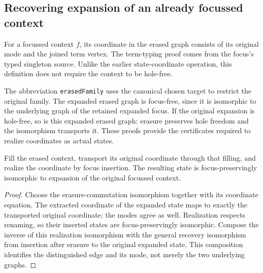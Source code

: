\subsection{Recovering expansion of an already focussed context}
\begin{definition}\label{term:context-coordinate}
For a focussed context $f$, its coordinate in the erased graph consists of its
original mode and the joined term vertex. The term-typing proof comes from the
focus's typed singleton source. Unlike the earlier state-coordinate operation,
this definition does not require the context to be hole-free.
\end{definition}
The abbreviation \texttt{erasedFamily} uses the canonical chosen target to
restrict the original family. The expanded erased graph is focus-free, since
it is isomorphic to the underlying graph of the retained expanded focus. If
the original expansion is hole-free, so is this expanded erased graph: erasure
preserves hole freedom and the isomorphism transports it. These proofs provide
the certificates required to realize coordinates as actual states.
\begin{theorem}
Fill the erased context, transport its original coordinate through that
filling, and realize the coordinate by focus insertion. The resulting state is
focus-preservingly isomorphic to expansion of the original focussed context.
\end{theorem}
\begin{proof}
Choose the erasure-commutation isomorphism together with its coordinate
equation. The extracted coordinate of the expanded state maps to exactly the
transported original coordinate; the modes agree as well. Realization respects
renaming, so their inserted states are focus-preservingly isomorphic. Compose
the inverse of this realization isomorphism with the general recovery
isomorphism from insertion after erasure to the original expanded state.
This composition identifies the distinguished edge and its mode, not merely
the two underlying graphs.
\end{proof}


